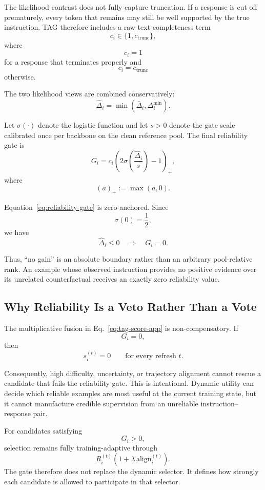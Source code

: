 The likelihood contrast does not fully capture truncation. If a
response is cut off prematurely, every token that remains may still
be well supported by the true instruction. TAG therefore includes a
raw-text completeness term
\[
c_i\in\{1,c_{\mathrm{trunc}}\},
\]
where
\[
c_i=1
\]
for a response that terminates properly and
\[
c_i=c_{\mathrm{trunc}}
\]
otherwise.

The two likelihood views are combined conservatively:
\begin{equation}
\widehat{\Delta}_i
=
\min
\left(
\bar{\Delta}_i,
\Delta_i^{\min}
\right).
\label{eq:gate-combined-gain}
\end{equation}

Let \(\sigma(\cdot)\) denote the logistic function and let \(s>0\)
denote the gate scale calibrated once per backbone on the clean
reference pool. The final reliability gate is
\begin{equation}
G_i
=
c_i
\left(
2\sigma
\left(
\frac{\widehat{\Delta}_i}{s}
\right)
-1
\right)_{+},
\label{eq:reliability-gate}
\end{equation}
where
\[
(a)_{+}:=\max(a,0).
\]

Equation~\eqref{eq:reliability-gate} is zero-anchored. Since
\[
\sigma(0)=\frac{1}{2},
\]
we have
\[
\widehat{\Delta}_i\le0
\quad\Longrightarrow\quad
G_i=0.
\]

Thus, ``no gain'' is an absolute boundary rather than an arbitrary
pool-relative rank. An example whose observed instruction provides
no positive evidence over its unrelated counterfactual receives an
exactly zero reliability value.


\subsection{Why Reliability Is a Veto Rather Than a Vote}
\label{app:gate-veto}

The multiplicative fusion in Eq.~\eqref{eq:tag-score-app} is
non-compensatory. If
\[
G_i=0,
\]
then
\[
s_i^{(t)}=0
\qquad
\text{for every refresh }t.
\]

Consequently, high difficulty, uncertainty, or trajectory alignment
cannot rescue a candidate that fails the reliability gate. This is
intentional. Dynamic utility can decide which reliable examples are
most useful at the current training state, but it cannot manufacture
credible supervision from an unreliable instruction--response pair.

For candidates satisfying
\[
G_i>0,
\]
selection remains fully training-adaptive through
\[
R_i^{(t)}
\left(
1+\lambda\,\mathrm{align}_i^{(t)}
\right).
\]
The gate therefore does not replace the dynamic selector. It defines
how strongly each candidate is allowed to participate in that
selector.


